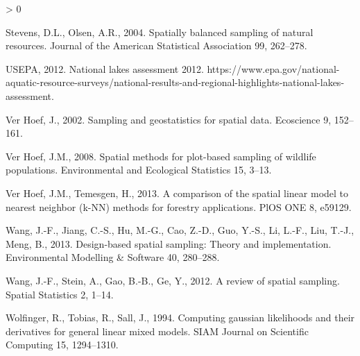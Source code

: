 \documentclass[]{elsarticle} %
\newlength{\cslhangindent}
\newenvironment{CSLReferences}[2] %
 {%
  \setlength{\parindent}{0pt}
  \ifodd #1 \everypar{\setlength{\hangindent}{\cslhangindent}}\ignorespaces\fi
  \ifnum #2 > 0
  \setlength{\parskip}{#2\baselineskip}
  \fi
 }%
 {}
\begin{document}
\begin{CSLReferences}{1}{0}
\leavevmode\hypertarget{ref-stevens2004spatially}{}%
Stevens, D.L., Olsen, A.R., 2004. Spatially balanced sampling of natural
resources. Journal of the American Statistical Association 99, 262--278.

\leavevmode\hypertarget{ref-USEPA2012NLA}{}%
USEPA, 2012. National lakes assessment 2012.
https://www.epa.gov/national-aquatic-resource-surveys/national-results-and-regional-highlights-national-lakes-assessment.

\leavevmode\hypertarget{ref-verhoef2002sampling}{}%
Ver Hoef, J., 2002. Sampling and geostatistics for spatial data.
Ecoscience 9, 152--161.

\leavevmode\hypertarget{ref-verhoef2008spatial}{}%
Ver Hoef, J.M., 2008. Spatial methods for plot-based sampling of
wildlife populations. Environmental and Ecological Statistics 15, 3--13.

\leavevmode\hypertarget{ref-ver2013comparison}{}%
Ver Hoef, J.M., Temesgen, H., 2013. A comparison of the spatial linear
model to nearest neighbor (k-NN) methods for forestry applications. PlOS
ONE 8, e59129.

\leavevmode\hypertarget{ref-wang2013design}{}%
Wang, J.-F., Jiang, C.-S., Hu, M.-G., Cao, Z.-D., Guo, Y.-S., Li, L.-F.,
Liu, T.-J., Meng, B., 2013. Design-based spatial sampling: Theory and
implementation. Environmental Modelling \& Software 40, 280--288.

\leavevmode\hypertarget{ref-wang2012review}{}%
Wang, J.-F., Stein, A., Gao, B.-B., Ge, Y., 2012. A review of spatial
sampling. Spatial Statistics 2, 1--14.

\leavevmode\hypertarget{ref-wolfinger1994computing}{}%
Wolfinger, R., Tobias, R., Sall, J., 1994. Computing gaussian
likelihoods and their derivatives for general linear mixed models. SIAM
Journal on Scientific Computing 15, 1294--1310.

\end{CSLReferences}
\end{document}

